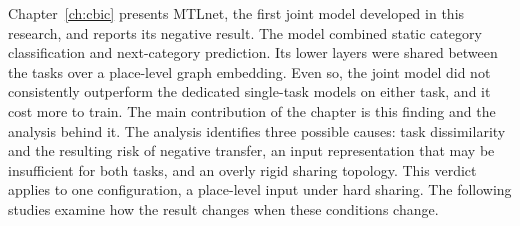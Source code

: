 Chapter~\ref{ch:cbic} presents MTLnet, the first joint model developed in this
research, and reports its negative result. The model combined static category
classification and next-category prediction. Its lower layers were shared between the
tasks over a place-level graph embedding. Even so, the joint model did not
consistently outperform the dedicated single-task models on either task, and it cost
more to train. The main contribution of the chapter is this finding and the analysis
behind it. The analysis identifies three possible causes: task dissimilarity and the
resulting risk of negative transfer, an input representation that may be insufficient
for both tasks, and an overly rigid sharing topology. This verdict applies to one
configuration, a place-level input under hard sharing. The following studies examine
how the result changes when these conditions change.


